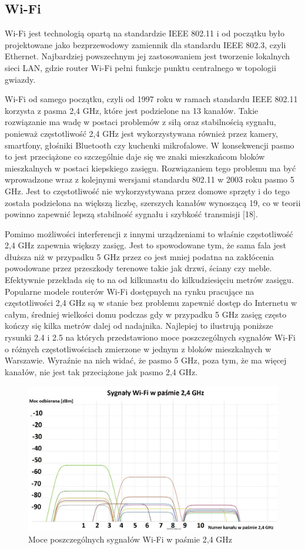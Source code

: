 \documentclass[12pt, twoside, openany]{mwrep}
\begin{document}
\subsection{Wi-Fi}

Wi-Fi jest technologią opartą na standardzie IEEE 802.11 i od początku było projektowane jako bezprzewodowy zamiennik dla standardu IEEE 802.3, czyli Ethernet. Najbardziej powszechnym jej zastosowaniem jest tworzenie lokalnych sieci LAN, gdzie router Wi-Fi pełni funkcje punktu centralnego w topologii gwiazdy. 
\par
Wi-Fi od samego początku, czyli od 1997 roku w ramach standardu IEEE 802.11 korzysta z pasma 2,4 GHz, które jest podzielone na 13 kanałów. Takie rozwiązanie ma wadę w postaci problemów z siłą oraz stabilnością sygnału, ponieważ częstotliwość 2,4 GHz jest wykorzystywana również przez kamery, smartfony, głośniki Bluetooth czy kuchenki mikrofalowe. W konsekwencji pasmo to jest przeciążone co szczególnie daje się we znaki mieszkańcom bloków mieszkalnych w postaci kiepskiego zasięgu. Rozwiązaniem tego problemu ma być wprowadzone wraz z kolejnymi wersjami standardu 802.11 w 2003 roku pasmo 5 GHz. Jest to częstotliwość nie wykorzystywana przez domowe sprzęty i do tego została podzielona na większą liczbę, szerszych kanałów wynoszącą 19, co w teorii powinno zapewnić lepszą stabilność sygnału i szybkość transmisji [18]. 
\par
Pomimo możliwości interferencji z innymi urządzeniami to właśnie częstotliwość 2,4 GHz zapewnia większy zasięg. Jest to spowodowane tym, że sama fala jest dłuższa niż w przypadku 5 GHz przez co jest mniej podatna na zakłócenia powodowane przez przeszkody terenowe takie jak drzwi, ściany czy meble. Efektywnie przekłada się to na od kilkunastu do kilkudziesięciu metrów zasięgu. Popularne modele routerów Wi-Fi dostępnych na rynku pracujące na częstotliwości 2,4 GHz są w stanie bez problemu zapewnić dostęp do Internetu w całym, średniej wielkości domu podczas gdy w przypadku 5 GHz zasięg często kończy się kilka metrów dalej od nadajnika. Najlepiej to ilustrują poniższe rysunki 2.4 i 2.5 na których przedstawiono moce poszczególnych sygnałów Wi-Fi o różnych częstotliwościach zmierzone w jednym z bloków mieszkalnych w Warszawie. Wyraźnie na nich widać, że pasmo 5 GHz, poza tym, że ma więcej kanałów, nie jest tak przeciążone jak pasmo 2,4 GHz.
\hfill \break
\begin{figure}[H]
\centering
\includegraphics[width=\textwidth]{2,4GHz}
\caption{Moce poszczególnych sygnałów Wi-Fi w paśmie 2,4 GHz}
\end{figure}
\end{document}
